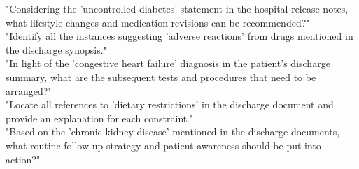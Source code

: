 "Considering the 'uncontrolled diabetes' statement in the hospital release notes, what lifestyle changes and medication revisions can be recommended?"\\
"Identify all the instances suggesting 'adverse reactions' from drugs mentioned in the discharge synopsis."\\
"In light of the 'congestive heart failure' diagnosis in the patient's discharge summary, what are the subsequent tests and procedures that need to be arranged?"\\
"Locate all references to 'dietary restrictions' in the discharge document and provide an explanation for each constraint."\\
"Based on the 'chronic kidney disease' mentioned in the discharge documents, what routine follow-up strategy and patient awareness should be put into action?"
